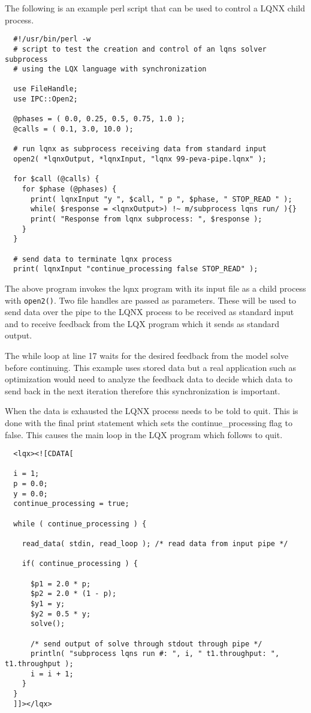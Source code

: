 The following is an example perl script that can be used to control a LQNX child process.

\lstset{language=Perl}
\begin{lstlisting}  
  #!/usr/bin/perl -w
  # script to test the creation and control of an lqns solver subprocess 
  # using the LQX language with synchronization

  use FileHandle;
  use IPC::Open2;

  @phases = ( 0.0, 0.25, 0.5, 0.75, 1.0 );
  @calls = ( 0.1, 3.0, 10.0 );

  # run lqnx as subprocess receiving data from standard input
  open2( *lqnxOutput, *lqnxInput, "lqnx 99-peva-pipe.lqnx" );

  for $call (@calls) {
    for $phase (@phases) {
      print( lqnxInput "y ", $call, " p ", $phase, " STOP_READ " );
      while( $response = <lqnxOutput>) !~ m/subprocess lqns run/ ){}
      print( "Response from lqnx subprocess: ", $response );
    }
  }

  # send data to terminate lqnx process
  print( lqnxInput "continue_processing false STOP_READ" );
\end{lstlisting}


The above program invokes the lqnx program with its input file as a child process with {\tt open2()}. Two file
handles are passed as parameters. These will be used to send data over the pipe to the LQNX process to be
received as standard input and to receive feedback from the LQX program which it sends as standard output.

The while loop at line 17 waits for the desired feedback from the model solve before continuing. This example
uses stored data but a real application such as optimization would need to analyze the feedback data to decide
which data to send back in the next iteration therefore this synchronization is important.

When the data is exhausted the LQNX process needs to be told to quit. This is done with the final print statement
which sets the continue\_processing flag to false. This causes the main loop in the LQX program which follows to
quit.

\lstset{language=LQX}
\begin{lstlisting}
  <lqx><![CDATA[

  i = 1;
  p = 0.0;
  y = 0.0;
  continue_processing = true;

  while ( continue_processing ) {

    read_data( stdin, read_loop ); /* read data from input pipe */

    if( continue_processing ) {

      $p1 = 2.0 * p;
      $p2 = 2.0 * (1 - p);
      $y1 = y;
      $y2 = 0.5 * y;
      solve();

      /* send output of solve through stdout through pipe */
      println( "subprocess lqns run #: ", i, " t1.throughput: ", t1.throughput );
      i = i + 1;
    }
  }
  ]]></lqx>

\end{lstlisting}

